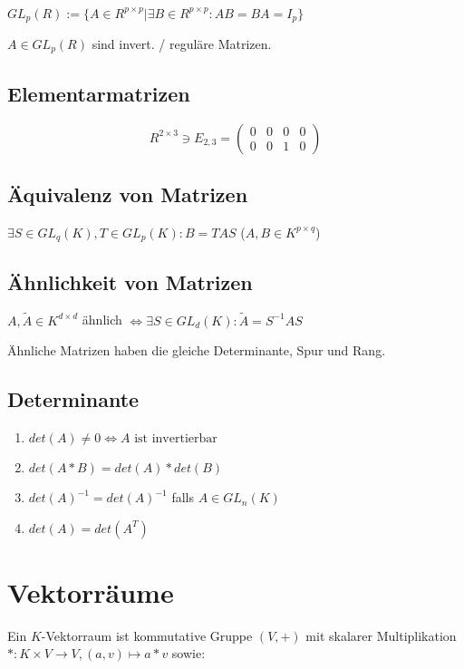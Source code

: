$GL_p(R) := \{ A \in R^{p \times p} | \exists B \in R^{p \times p} : AB = BA = I_p \}$

$A \in GL_p(R)$ sind invert. / reguläre Matrizen.

\subsection*{Elementarmatrizen}

\[ R^{2 \times 3} \ni E_{2,3} = \begin{pmatrix}
	0 & 0 & 0 & 0 \\
	0 & 0 & 1 & 0
\end{pmatrix} \]

\subsection*{Äquivalenz von Matrizen}

$\exists S \in GL_q(K), T \in GL_p(K) : B = T A S$ ($A, B \in K^{p \times q}$)

\subsection*{Ähnlichkeit von Matrizen}

$A, \tilde A \in K^{d \times d}$ ähnlich $\Leftrightarrow \exists S \in GL_d(K) : \tilde A = S^{-1}AS$

Ähnliche Matrizen haben die gleiche Determinante, Spur und Rang.

\subsection*{Determinante}

\begin{enumerate}[label=(\alph*)]
	\item $det(A) \neq 0 \Leftrightarrow A \text{ ist invertierbar}$
	\item $det(A*B) = det(A) * det(B)$
	\item $det(A)^{-1} = det(A)^{-1}$ falls $A \in GL_n(K)$
	\item $det(A) = det(A^T)$
\end{enumerate}

\section*{Vektorräume}

Ein $K$-Vektorraum ist kommutative Gruppe $(V, +)$ mit skalarer Multiplikation $* : K \times V \rightarrow V, (a, v) \mapsto a * v$ sowie:

